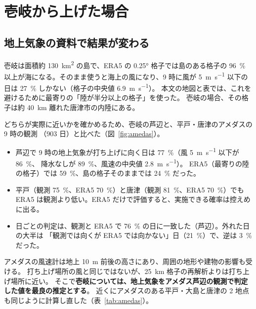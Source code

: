 \section{壱岐から上げた場合}
\label{sec:iki}

\subsection{地上気象の資料で結果が変わる}
\label{sec:amedas}

壱岐は面積約 \SI{130}{\square\kilo\metre} の島で、ERA5 の \ang{0.25} 格子では島のある格子の
\SI{96}{\percent} 以上が海になる。そのまま使うと海上の風になり、9 時に風が
\SI{5}{\metre\per\second} 以下の日は \SI{27}{\percent} しかない（格子の中央値 \SI{6.9}{\metre\per\second}）。
本文の地図と表では、これを避けるために最寄りの「陸が半分以上の格子」を使った。
壱岐の場合、その格子は約 \SI{40}{\kilo\metre} 離れた唐津市の内陸にある。

どちらが実際に近いかを確かめるため、壱岐の芦辺と、平戸・唐津のアメダスの 9 時の観測
（903 日）と比べた（図~\ref{fig:amedas}）。
\begin{itemize}
  \item 芦辺で 9 時の地上気象が打ち上げに向く日は \SI{77}{\percent}（風 \SI{5}{\metre\per\second} 以下が \SI{86}{\percent}、
    降水なしが \SI{89}{\percent}、風速の中央値 \SI{2.8}{\metre\per\second}）。
    ERA5（最寄りの陸の格子）では \SI{59}{\percent}、島の格子そのままでは \SI{24}{\percent} だった。
  \item 平戸（観測 \SI{75}{\percent}、ERA5 \SI{70}{\percent}）と唐津（観測 \SI{81}{\percent}、ERA5 \SI{70}{\percent}）でも
    ERA5 は観測より低い。ERA5 だけで評価すると、実施できる確率は控えめに出る。
  \item 日ごとの判定は、観測と ERA5 で \SI{76}{\percent} の日に一致した（芦辺）。外れた日の大半は
    「観測では向くが ERA5 では向かない」日（\SI{21}{\percent}）で、逆は \SI{3}{\percent} だった。
\end{itemize}

アメダスの風速計は地上 \SI{10}{\metre} 前後の高さにあり、周囲の地形や建物の影響も受ける。
打ち上げ場所の風と同じではないが、\SI{25}{\kilo\metre} 格子の再解析よりは打ち上げ場所に近い。
そこで\textbf{壱岐については、地上気象をアメダス芦辺の観測で判定した値を最良の推定とする}。
近くにアメダスのある平戸・大島と唐津の 2 地点も同じように計算し直した（表~\ref{tab:amedas}）。

\begin{table}[htbp]
\centering
\scriptsize
\caption{地上気象をアメダスの 9 時の観測で判定した場合。ERA5 の列は本文の地図と表~\ref{tab:sites} の値。
観測が欠けた日（各地点 1--4 日）は ERA5 の判定を使った。}
\label{tab:amedas}
\resizebox{\linewidth}{!}{}
\end{table}


